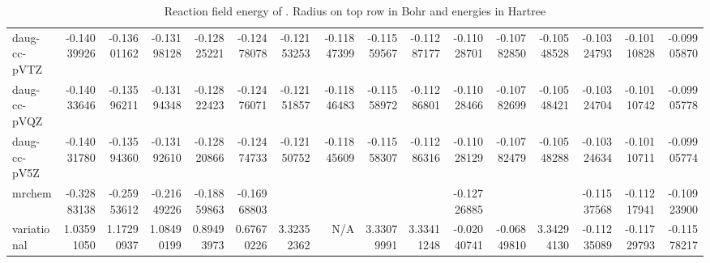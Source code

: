 \documentclass[../master_thesis.tex]{subfiles}
\begin{document}
\begin{sidewaystable}
{{\begin{tabular}{l|r|r|r|r|r|r|r|r|r|r|r|r|r|r|r}
daug-cc-pVTZ & -0.14039926 & -0.13601162 & -0.13198128 & -0.12825221 & -0.12478078 & -0.12153253 & -0.11847399 & -0.11559567 & -0.11287177 & -0.11028701 & -0.10782850 & -0.10548528 & -0.10324793 & -0.10110828 & -0.09905870 \\
daug-cc-pVQZ & -0.14033646 & -0.13596211 & -0.13194348 & -0.12822423 & -0.12476071 & -0.12151857 & -0.11846483 & -0.11558972 & -0.11286801 & -0.11028466 & -0.10782699 & -0.10548421 & -0.10324704 & -0.10110742 & -0.09905778 \\
daug-cc-pV5Z & -0.14031780 & -0.13594360 & -0.13192610 & -0.12820866 & -0.12474733 & -0.12150752 & -0.11845609 & -0.11558307 & -0.11286316 & -0.11028129 & -0.10782479 & -0.10548288 & -0.10324634 & -0.10110711 & -0.09905774 \\ \hline
mrchem & -0.32883138 & -0.25953612 & -0.21649226 & -0.18859863 & -0.16968803 & \multicolumn{1}{l|}{} & \multicolumn{1}{l|}{} & \multicolumn{1}{l|}{} & \multicolumn{1}{l|}{} & -0.12726885 & \multicolumn{1}{l|}{} & \multicolumn{1}{l|}{} & -0.11537568 & -0.11217941 & -0.10923900 \\
variational & 1.03591050 & 1.17290937 & 1.08490199 & 0.89493973 & 0.67670226 & 3.32352362 & N/A & 3.33079991 & 3.33411248 & -0.02040741 & -0.06849810 & 3.34294130 & -0.11235089 & -0.11729793 & -0.11578217 \\
\end{tabular}}}{\caption{Reaction field energy of . Radius on top row in Bohr and energies in Hartree}
  \label{tab:Erdatanop}}


\end{sidewaystable}
\end{document}
